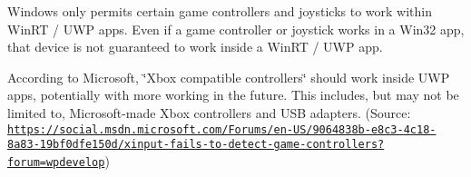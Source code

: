 Windows only permits certain game controllers and joysticks to work within Win\+RT / U\+WP apps. Even if a game controller or joystick works in a Win32 app, that device is not guaranteed to work inside a Win\+RT / U\+WP app.

According to Microsoft, \char`\"{}\+Xbox compatible controllers\char`\"{} should work inside U\+WP apps, potentially with more working in the future. This includes, but may not be limited to, Microsoft-\/made Xbox controllers and U\+SB adapters. (Source\+: \href{https://social.msdn.microsoft.com/Forums/en-US/9064838b-e8c3-4c18-8a83-19bf0dfe150d/xinput-fails-to-detect-game-controllers?forum=wpdevelop}{\tt https\+://social.\+msdn.\+microsoft.\+com/\+Forums/en-\/\+U\+S/9064838b-\/e8c3-\/4c18-\/8a83-\/19bf0dfe150d/xinput-\/fails-\/to-\/detect-\/game-\/controllers?forum=wpdevelop}) 
